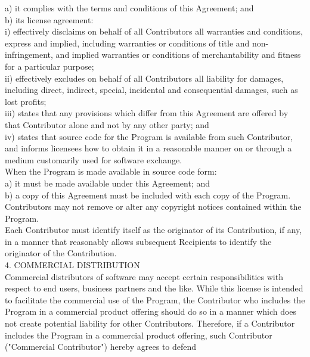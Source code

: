 {      a) it complies with the terms and conditions of this Agreement;
      and
\\[4pt]
      b) its license agreement:
\\[4pt]
      i) effectively disclaims on behalf of all Contributors all
      warranties and conditions, express and implied, including
      warranties or conditions of title and non-infringement, and
      implied warranties or conditions of merchantability and fitness
      for a particular purpose;
\\[4pt]
      ii) effectively excludes on behalf of all Contributors all
      liability for damages, including direct, indirect, special,
      incidental and consequential damages, such as lost profits;
\\[4pt]
      iii) states that any provisions which differ from this Agreement
      are offered by that Contributor alone and not by any other
      party; and
\\[4pt]
      iv) states that source code for the Program is available from
      such Contributor, and informs licensees how to obtain it in a
      reasonable manner on or through a medium customarily used for
      software exchange.
\\[4pt]
When the Program is made available in source code form:
\\[4pt]
      a) it must be made available under this Agreement; and 
\\[4pt]
      b) a copy of this Agreement must be included with each copy of
      the Program.
\\[4pt]
Contributors may not remove or alter any copyright notices contained
within the Program.
\\[4pt]
Each Contributor must identify itself as the originator of its
Contribution, if any, in a manner that reasonably allows subsequent
Recipients to identify the originator of the Contribution.
\\[4pt]
4. COMMERCIAL DISTRIBUTION
\\[4pt]
Commercial distributors of software may accept certain
responsibilities with respect to end users, business partners and the
like. While this license is intended to facilitate the commercial use
of the Program, the Contributor who includes the Program in a
commercial product offering should do so in a manner which does not
create potential liability for other Contributors. Therefore, if a
Contributor includes the Program in a commercial product offering,
such Contributor ("Commercial Contributor") hereby agrees to defend
}
